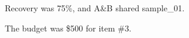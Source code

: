 \documentclass{article}
\begin{document}
Recovery was 75\%, and A\&B shared sample\_01.

The budget was \$500 for item \#3.
\end{document}
